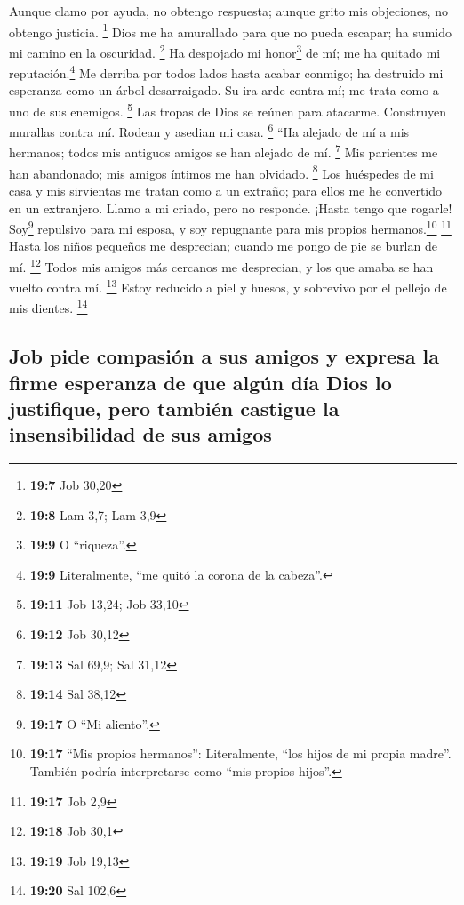  Aunque clamo por ayuda, no obtengo respuesta; aunque
grito mis objeciones, no obtengo justicia. \footnote{\textbf{19:7} Job
  30,20}  Dios me ha amurallado para que no pueda escapar;
ha sumido mi camino en la oscuridad. \footnote{\textbf{19:8} Lam 3,7;
  Lam 3,9}  Ha despojado mi honor\footnote{\textbf{19:9} O
  ``riqueza''.} de mí; me ha quitado mi reputación.\footnote{\textbf{19:9}
  Literalmente, ``me quitó la corona de la cabeza''.}  Me
derriba por todos lados hasta acabar conmigo; ha destruido mi esperanza
como un árbol desarraigado.  Su ira arde contra mí; me
trata como a uno de sus enemigos. \footnote{\textbf{19:11} Job 13,24;
  Job 33,10}  Las tropas de Dios se reúnen para atacarme.
Construyen murallas contra mí. Rodean y asedian mi casa. \footnote{\textbf{19:12}
  Job 30,12}  ``Ha alejado de mí a mis hermanos; todos
mis antiguos amigos se han alejado de mí. \footnote{\textbf{19:13} Sal
  69,9; Sal 31,12}  Mis parientes me han abandonado; mis
amigos íntimos me han olvidado. \footnote{\textbf{19:14} Sal 38,12}
 Los huéspedes de mi casa y mis sirvientas me tratan como
a un extraño; para ellos me he convertido en un extranjero.
 Llamo a mi criado, pero no responde. ¡Hasta tengo que
rogarle!  Soy\footnote{\textbf{19:17} O ``Mi aliento''.}
repulsivo para mi esposa, y soy repugnante para mis propios
hermanos.\footnote{\textbf{19:17} ``Mis propios hermanos'':
  Literalmente, ``los hijos de mi propia madre''. También podría
  interpretarse como ``mis propios hijos''.} \footnote{\textbf{19:17}
  Job 2,9}  Hasta los niños pequeños me desprecian;
cuando me pongo de pie se burlan de mí. \footnote{\textbf{19:18} Job
  30,1}  Todos mis amigos más cercanos me desprecian, y
los que amaba se han vuelto contra mí. \footnote{\textbf{19:19} Job
  19,13}  Estoy reducido a piel y huesos, y sobrevivo por
el pellejo de mis dientes. \footnote{\textbf{19:20} Sal 102,6}

\hypertarget{job-pide-compasiuxf3n-a-sus-amigos-y-expresa-la-firme-esperanza-de-que-alguxfan-duxeda-dios-lo-justifique-pero-tambiuxe9n-castigue-la-insensibilidad-de-sus-amigos}{%
\subsection{Job pide compasión a sus amigos y expresa la firme esperanza
de que algún día Dios lo justifique, pero también castigue la
insensibilidad de sus
amigos}\label{job-pide-compasiuxf3n-a-sus-amigos-y-expresa-la-firme-esperanza-de-que-alguxfan-duxeda-dios-lo-justifique-pero-tambiuxe9n-castigue-la-insensibilidad-de-sus-amigos}}

